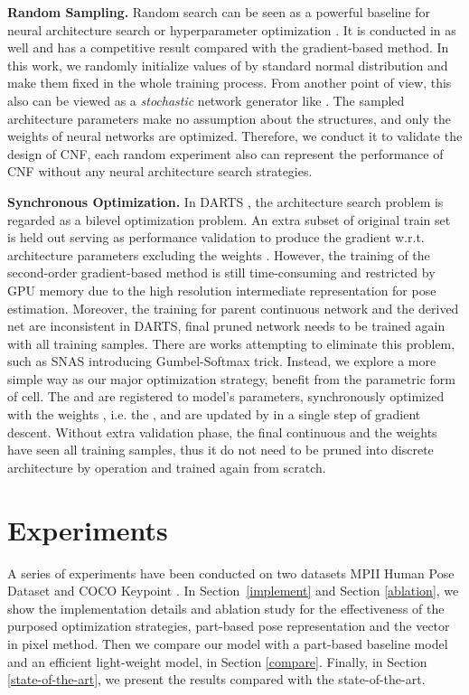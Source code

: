 \documentclass[journal]{IEEEtran}
\begin{document}
\textbf{Random Sampling.} Random search can be seen as a powerful baseline for neural architecture search or hyperparameter optimization \cite{Xie_2019_ICCV,bergstra2012random,li2019random}. It is conducted in \cite{liu2018darts} as well and has a competitive result compared with the gradient-based method. In this work, we randomly initialize values of  by standard normal distribution and make them fixed in the whole training process.   From another point of view, this also can be viewed as a \emph{stochastic} network generator like \cite{Xie_2019_ICCV}. The sampled architecture parameters make no assumption about the structures, and only the weights of neural networks are optimized. Therefore, we conduct it to validate the design of CNF, each random experiment also can represent the performance of CNF without any neural architecture search strategies.

\textbf{Synchronous Optimization.} In DARTS \cite{liu2018darts}, the architecture search problem is regarded as a bilevel optimization problem. An extra subset  of original train set is held out serving as performance validation to produce the gradient w.r.t. architecture parameters  excluding the weights . However, the training of the second-order gradient-based method is still time-consuming and restricted by GPU memory due to the high resolution intermediate representation for pose estimation. Moreover, the training for parent continuous network and the derived net are inconsistent  in DARTS, final pruned network needs to be trained again with all training samples.  There are works attempting to eliminate this problem, such as SNAS \cite{xie2018snas} introducing Gumbel-Softmax trick. Instead, we explore a more simple way as our major optimization strategy, benefit from the parametric form of cell. The  and  are registered to model's parameters, synchronously optimized with the weights , i.e. the ,  and  are updated by  in a single step of gradient descent. Without extra validation phase, the final continuous  and the weights  have seen all training samples, thus it do not need to be pruned into discrete architecture by  operation and trained again from scratch.

\section{Experiments}


A series of experiments have been conducted on two datasets MPII Human Pose Dataset \cite{andriluka20142d} and COCO Keypoint \cite{lin2014microsoft}. In Section~\ref{implement} and Section \ref{ablation}, we show the implementation details and ablation study for the effectiveness of the purposed optimization strategies, part-based pose representation and the vector in pixel method. Then we compare our model with a part-based baseline model and an efficient light-weight model, in Section \ref{compare}. Finally, in Section \ref{state-of-the-art}, we present the results compared with the state-of-the-art.
\end{document}
